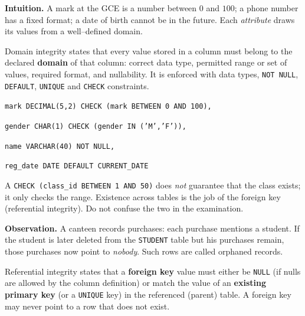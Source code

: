 \documentclass[11pt]{article}
\newcommand{\cle}[1]{{\popxbold\color{popdark}#1}}
\newcounter{popsec}
\newcounter{popsub}
\newcommand{\courssub}[1]{%
  \stepcounter{popsub}%
  \par\vspace{9pt}\noindent{\popxbold\fontsize{11.5}{13}\selectfont\color{popink}{\color{poporange}\thepopsec.\thepopsub}\hspace{6pt}#1}\par\nopagebreak\vspace{4pt}
}
\begin{document}
\textbf{Intuition.} A mark at the GCE is a number between $0$ and $100$; a phone number has a fixed format; a date of birth cannot be in the future. Each \emph{attribute} draws its values from a well--defined \cle{domain}.

\begin{definition}
\cle{Domain integrity} states that every value stored in a column must belong to the declared \textbf{domain} of that column: correct data type, permitted range or set of values, required format, and nullability. It is enforced with data types, \texttt{NOT NULL}, \texttt{DEFAULT}, \texttt{UNIQUE} and \texttt{CHECK} constraints.
\end{definition}

\begin{exemplebox}
\texttt{mark DECIMAL(5,2) CHECK (mark BETWEEN 0 AND 100),}\par
\texttt{gender CHAR(1) CHECK (gender IN ('M','F')),}\par
\texttt{name VARCHAR(40) NOT NULL,}\par
\texttt{reg\_date DATE DEFAULT CURRENT\_DATE}
\end{exemplebox}

\begin{attention}
A \texttt{CHECK (class\_id BETWEEN 1 AND 50)} does \emph{not} guarantee that the class exists; it only checks the range. Existence across tables is the job of the foreign key (referential integrity). Do not confuse the two in the examination.
\end{attention}

\courssub{Referential Integrity}

\textbf{Observation.} A canteen records purchases: each purchase mentions a student. If the student is later deleted from the \texttt{STUDENT} table but his purchases remain, those purchases now point to \emph{nobody}. Such rows are called \cle{orphaned records}.

\begin{definition}
\cle{Referential integrity} states that a \textbf{foreign key} value must either be \texttt{NULL} (if nulls are allowed by the column definition) or match the value of an \textbf{existing primary key} (or a \texttt{UNIQUE} key) in the referenced (parent) table. A foreign key may never point to a row that does not exist.
\end{definition}
\end{document}

